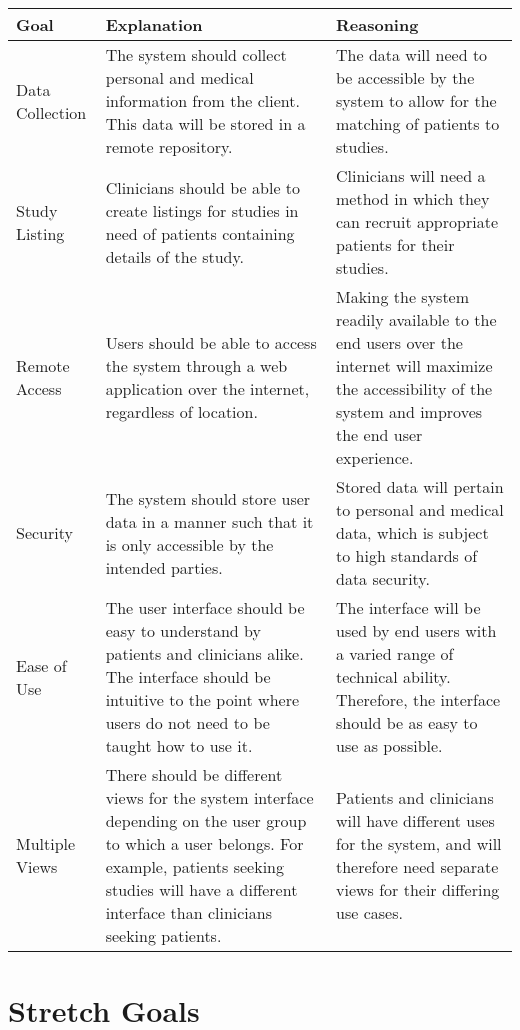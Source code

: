 \documentclass{article}
\begin{document}
\begin{table}[H]
\centering
\begin{tabular}{| p{3cm} | p{5cm} | p{5cm} |}
\hline
Goal & Explanation & Reasoning \\
\hline  \hline
Data Collection & The system should collect personal and medical information from the client. This data will be stored in a remote repository. & The data will need to be accessible by the system to allow for the matching of patients to studies. \\
\hline
Study Listing & Clinicians should be able to create listings for studies in need of patients containing details of the study. & Clinicians will need a method in which they can recruit appropriate patients for their studies.  \\
\hline
Remote Access & Users should be able to access the system through a web application over the internet, regardless of location. & Making the system readily available to the end users over the internet will maximize the accessibility of the system and improves the end user experience. \\
\hline
Security & The system should store user data in a manner such that it is only accessible by the intended parties. & Stored data will pertain to personal and medical data, which is subject to high standards of data security. \\
\hline
Ease of Use & The user interface should be easy to understand by patients and clinicians alike. The interface should be intuitive to the point where users do not need to be taught how to use it. & The interface will be used by end users with a varied range of technical ability. Therefore, the interface should be as easy to use as possible. \\
\hline
Multiple Views & There should be different views for the system interface depending on the user group to which a user belongs. For example, patients seeking studies will have a different interface than clinicians seeking patients. & Patients and clinicians will have different uses for the system, and will therefore need separate views for their differing use cases. \\
\hline


\end{tabular}
\end{table}

\section{Stretch Goals}
\end{document}
